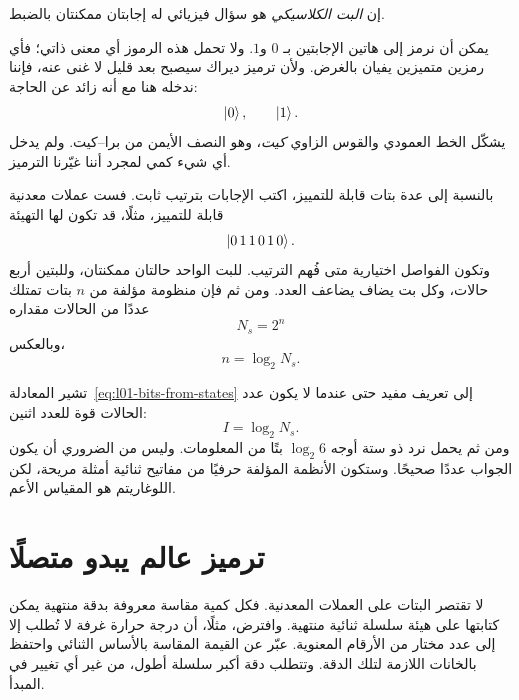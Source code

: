 \begin{definition}
إن \emph{البت الكلاسيكي} هو سؤال فيزيائي له إجابتان ممكنتان بالضبط.
\end{definition}

يمكن أن نرمز إلى هاتين الإجابتين بـ \(0\) و\(1\). ولا تحمل هذه الرموز أي معنى ذاتي؛ فأي رمزين متميزين يفيان بالغرض. ولأن ترميز ديراك سيصبح بعد قليل لا غنى عنه، فإننا ندخله هنا مع أنه زائد عن الحاجة:
\begin{equation}
  \left\lvert0\right\rangle,
  \qquad
  \left\lvert1\right\rangle.
\end{equation}
يشكّل الخط العمودي والقوس الزاوي \emph{كيت}، وهو النصف الأيمن من برا--كيت. ولم يدخل أي شيء كمي لمجرد أننا غيّرنا الترميز.

بالنسبة إلى عدة بتات قابلة للتمييز، اكتب الإجابات بترتيب ثابت. فست عملات معدنية قابلة للتمييز، مثلًا، قد تكون لها التهيئة
\begin{equation}
  \left\lvert0\,1\,1\,0\,1\,0\right\rangle.
\end{equation}
وتكون الفواصل اختيارية متى فُهم الترتيب. للبت الواحد حالتان ممكنتان، وللبتين أربع حالات، وكل بت يضاف يضاعف العدد. ومن ثم فإن منظومة مؤلفة من \(n\) بتات تمتلك عددًا من الحالات مقداره
\begin{equation}
  N_s=2^n
  \label{eq:l01-state-count}
\end{equation}
وبالعكس،
\begin{equation}
  n=\log_2 N_s.
  \label{eq:l01-bits-from-states}
\end{equation}

تشير المعادلة~\eqref{eq:l01-bits-from-states} إلى تعريف مفيد حتى عندما لا يكون عدد الحالات قوة للعدد اثنين:
\begin{equation}
  I=\log_2 N_s.
  \label{eq:l01-information}
\end{equation}
ومن ثم يحمل نرد ذو ستة أوجه \(\log_2 6\) بتًا من المعلومات. وليس من الضروري أن يكون الجواب عددًا صحيحًا. وستكون الأنظمة المؤلفة حرفيًا من مفاتيح ثنائية أمثلة مريحة، لكن اللوغاريتم هو المقياس الأعم.

\section{ترميز عالم يبدو متصلًا}

لا تقتصر البتات على العملات المعدنية. فكل كمية مقاسة معروفة بدقة منتهية يمكن كتابتها على هيئة سلسلة ثنائية منتهية. وافترض، مثلًا، أن درجة حرارة غرفة لا تُطلب إلا إلى عدد مختار من الأرقام المعنوية. عبّر عن القيمة المقاسة بالأساس الثنائي واحتفظ بالخانات اللازمة لتلك الدقة. وتتطلب دقة أكبر سلسلة أطول، من غير أي تغيير في المبدأ.

